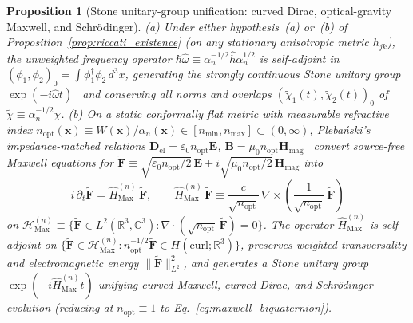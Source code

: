 \documentclass[aps,prd,onecolumn,tightenlines,nofootinbib,notitlepage,10pt,floatfix]{revtex4-2}
\theoremstyle{indentedtheorem}
\newtheorem{proposition}{Proposition}
\begin{document}
\begin{proposition}[Stone unitary-group unification: curved Dirac, optical-gravity Maxwell, and Schr\"odinger]\label{prop:stone_unification}
(a) Under either hypothesis~(a) or~(b) of Proposition~\ref{prop:riccati_existence} (on any stationary anisotropic metric $h_{jk}$), the unweighted frequency operator $\hbar\hat{\omega}\equiv\alpha_n^{-1/2}\hat{h}\alpha_n^{1/2}$ is self-adjoint in $(\phi_1,\phi_2)_0=\int\phi_1^\dagger\phi_2\,d^3x$, generating the strongly continuous Stone unitary group $\exp(-i\hat{\omega}t)$~\citep{Stone1932} and conserving all norms and overlaps $(\tilde{\chi}_1(t),\tilde{\chi}_2(t))_0$ of $\tilde{\chi}\equiv\alpha_n^{-1/2}\chi$.
(b) On a static conformally flat metric with measurable refractive index $n_\text{opt}(\mathbf{x})\equiv W(\mathbf{x})/\alpha_n(\mathbf{x})\in[n_{\min},n_{\max}]\subset(0,\infty)$, Pleba\'nski's impedance-matched relations $\mathbf{D}_\text{el}=\varepsilon_0 n_\text{opt}\mathbf{E}$, $\mathbf{B}=\mu_0 n_\text{opt}\mathbf{H}_\text{mag}$~\citep{Plebanski1960Electromagnetic} convert source-free Maxwell equations for $\tilde{\mathbf{F}}\equiv\sqrt{\varepsilon_0 n_\text{opt}/2}\,\mathbf{E}+i\sqrt{\mu_0 n_\text{opt}/2}\,\mathbf{H}_\text{mag}$ into
\begin{equation}
    i\,\partial_t\tilde{\mathbf{F}} = \hat{H}_\text{Max}^{(n)}\,\tilde{\mathbf{F}} , \qquad \hat{H}_\text{Max}^{(n)}\,\tilde{\mathbf{F}} \equiv \frac{c}{\sqrt{n_\text{opt}}}\,\nabla\times\!\left(\frac{1}{\sqrt{n_\text{opt}}}\,\tilde{\mathbf{F}}\right)
    \label{eq:optical_maxwell_ham}
\end{equation}
on $\mathcal{H}_\text{Max}^{(n)}\equiv\{\tilde{\mathbf{F}}\in L^2(\mathbb{R}^3,\mathbb{C}^3):\nabla\cdot(\sqrt{n_\text{opt}}\,\tilde{\mathbf{F}})=0\}$. The operator $\hat{H}_\text{Max}^{(n)}$ is self-adjoint on $\{\tilde{\mathbf{F}}\in\mathcal{H}_\text{Max}^{(n)}:n_\text{opt}^{-1/2}\tilde{\mathbf{F}}\in H(\mathrm{curl};\mathbb{R}^3)\}$, preserves weighted transversality and electromagnetic energy $\|\tilde{\mathbf{F}}\|_{L^2}^2$, and generates a Stone unitary group $\exp(-i\hat{H}_\text{Max}^{(n)}t)$ unifying curved Maxwell, curved Dirac, and Schr\"odinger evolution (reducing at $n_\text{opt}\equiv 1$ to Eq.~\eqref{eq:maxwell_biquaternion}).
\end{proposition}
\end{document}

